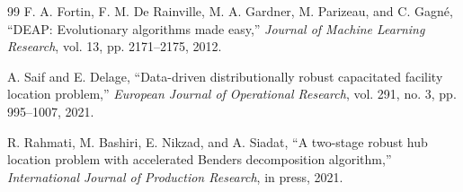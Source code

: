 \documentclass[conference]{IEEEtran}
\begin{document}
\begin{thebibliography}{99}
 F. A. Fortin, F. M. De Rainville, M. A. Gardner, M. Parizeau, and C. Gagné, ``DEAP: Evolutionary algorithms made easy,'' \emph{Journal of Machine Learning Research}, vol. 13, pp. 2171--2175, 2012.

 A. Saif and E. Delage, ``Data-driven distributionally robust capacitated facility location problem,'' \emph{European Journal of Operational Research}, vol. 291, no. 3, pp. 995--1007, 2021.

 R. Rahmati, M. Bashiri, E. Nikzad, and A. Siadat, ``A two-stage robust hub location problem with accelerated Benders decomposition algorithm,'' \emph{International Journal of Production Research}, in press, 2021.

\end{thebibliography}
\end{document}
